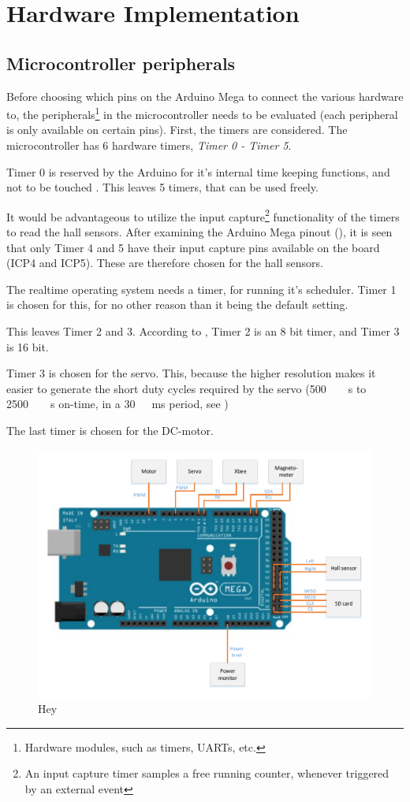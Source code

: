 \section{Hardware Implementation}
\subsection{Microcontroller peripherals}
Before choosing which pins on the Arduino Mega to connect the various hardware to, the peripherals\footnote{Hardware modules, such as timers, UARTs, etc.} in the microcontroller needs to be evaluated (each peripheral is only available on certain pins). First, the timers are considered. The microcontroller has 6 hardware timers, \emph{Timer 0 - Timer 5}.

Timer 0 is reserved by the Arduino for it's internal time keeping functions, and not to be touched \cite{ArduinoPWM}. This leaves 5 timers, that can be used freely.

It would be advantageous to utilize the input capture\footnote{An input capture timer samples a free running counter, whenever triggered by  an external event} functionality of the timers to read the hall sensors. After examining the Arduino Mega pinout (), it is seen that only Timer 4 and 5 have their input capture pins available on the board (ICP4 and ICP5). These are therefore chosen for the hall sensors.
   
The realtime operating system needs a timer, for running it's scheduler. Timer 1 is chosen for this, for no other reason than it being the default setting.

This leaves Timer 2 and 3. According to \cite{Atmega}, Timer 2 is an 8 bit timer, and Timer 3 is 16 bit. 

Timer 3 is chosen for the servo. This, because the higher resolution makes it easier to generate the short duty cycles required by the servo (\si{500\ \mu s} to \si{2500\ \mu s} on-time, in a \si{30\ ms} period, see )

The last timer is chosen for the DC-motor.

\begin{figure}[H]
	\centering
	\includegraphics[scale=0.75]{figures/MegaSetup.pdf}
	\caption{Hey}
	\label{MegaSetup}
\end{figure}

